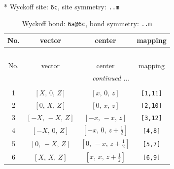 \documentclass[fleqn,8pt]{jsarticle}
\begin{document}
* Wyckoff site: {\tt 6c}, site symmetry: {\tt ..m}
\renewcommand{\arraystretch}{1.2}
\begin{longtable}{cccc}
\caption{Wyckoff bond: {\tt 6a@6c}, bond symmetry: {\tt ..m}}
 \\
 \hline \hline
No. & vector & center & mapping \\ \hline \endfirsthead

\multicolumn{3}{l}{\tablename\ \thetable{}} \\
 \hline \hline
No. & vector & center & mapping \\ \hline \endhead

 \hline \hline
\multicolumn{3}{r}{\footnotesize\it continued ...} \\ \endfoot

 \hline \hline
\multicolumn{3}{r}{} \\ \endlastfoot

1 & $\left[ X,\, 0,\, Z \right]$ & $\left[ x,\, 0,\, z \right]$ & {\tt [1,11]} \\ \hline
2 & $\left[ 0,\, X,\, Z \right]$ & $\left[ 0,\, x,\, z \right]$ & {\tt [2,10]} \\ \hline
3 & $\left[ - X,\, - X,\, Z \right]$ & $\left[ - x,\, - x,\, z \right]$ & {\tt [3,12]} \\ \hline
4 & $\left[ - X,\, 0,\, Z \right]$ & $\left[ - x,\, 0,\, z + \frac{1}{2} \right]$ & {\tt [4,8]} \\ \hline
5 & $\left[ 0,\, - X,\, Z \right]$ & $\left[ 0,\, - x,\, z + \frac{1}{2} \right]$ & {\tt [5,7]} \\ \hline
6 & $\left[ X,\, X,\, Z \right]$ & $\left[ x,\, x,\, z + \frac{1}{2} \right]$ & {\tt [6,9]} \\
\end{longtable}
\renewcommand{\arraystretch}{1.2}
\end{document}
